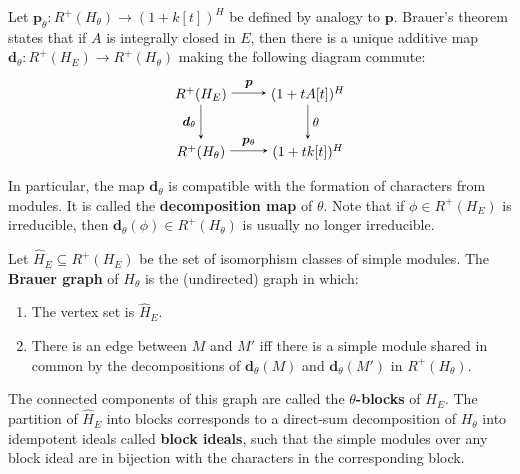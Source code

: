 \documentclass[a4paper,10pt,leqno]{amsart}
\theoremstyle{plain}
\theoremstyle{plain}
\theoremstyle{plain}
\theoremstyle{definition}
\theoremstyle{remark}
\newcommand{\dfemph}[1]{\textbf{#1}}
\begin{document}
Let $\bm{p}_\theta : R^+(H_\theta) \to (1 + k[t])^H$ be defined by analogy to $\bm{p}$.
Brauer's theorem \cite[Thm.\ 7.4.3]{gp} states that if $A$ is integrally closed in $E$, then there is a unique additive map $\bm{d}_\theta : R^+(H_E) \to R^+(H_\theta)$ making the following diagram commute:
\begin{equation}
\begin{tikzpicture}[baseline=(current bounding box.center), >=stealth]
\matrix(m)[matrix of math nodes, row sep=2.5em, column sep=2.5em, text height=2ex, text depth=0.25ex]
{	R^+(H_E)
		&(1 + tA[t])^H\\
	R^+(H_\theta)
		&(1 + tk[t])^H\\
		};
\path[->,font=\small, auto]
(m-1-1)	edge node{$\bm{p}$} (m-1-2)
		edge node[left]{$\bm{d}_\theta$} (m-2-1)
(m-1-2)	edge node[right]{$\theta$} (m-2-2)
(m-2-1)	edge node{$\bm{p}_\theta$} (m-2-2);
\end{tikzpicture}
\end{equation}
In particular, the map $\bm{d}_\theta$ is compatible with the formation of characters from modules.
It is called the \dfemph{decomposition map} of $\theta$.
Note that if $\phi \in R^+(H_E)$ is irreducible, then $\bm{d}_\theta(\phi) \in R^+(H_\theta)$ is usually no longer irreducible.

Let $\hat{H}_E \subseteq R^+(H_E)$ be the set of isomorphism classes of simple modules.
The \dfemph{Brauer graph} of $H_\theta$ is the (undirected) graph in which:
\begin{enumerate}
\item 	The vertex set is $\hat{H}_E$.
\item 	There is an edge between $M$ and $M'$ iff there is a simple module shared in common by the decompositions of $\bm{d}_\theta(M)$ and $\bm{d}_\theta(M')$ in $R^+(H_\theta)$.
\end{enumerate}
The connected components of this graph are called the \dfemph{$\theta$-blocks} of $H_E$.
The partition of $\hat{H}_E$ into blocks corresponds to a direct-sum decomposition of $H_\theta$ into idempotent ideals called \dfemph{block ideals}, such that the simple modules over any block ideal are in bijection with the characters in the corresponding block.

\subsubsection{}
\end{document}
